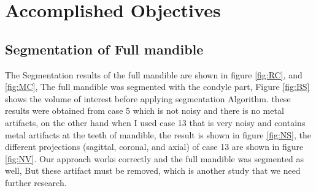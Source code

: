 \documentclass[11.5pt, b5paper]{article}
\begin{document}
\section{Accomplished Objectives}
\subsection{Segmentation of Full mandible}
The Segmentation results of the full mandible are shown in figure \ref{fig:RC}, and \ref{fig:MC}, The full mandible was segmented with the condyle part, Figure \ref{fig:BS} shows the volume of interest before applying segmentation Algorithm. these results were obtained from case 5 which is not noisy and there is no metal artifacts, on the other hand when I used case 13 that is very noisy and contains metal artifacts at the teeth of mandible, the result is shown in figure \ref{fig:NS}, the different projections (sagittal, coronal, and axial) of case 13 are shown in figure \ref{fig:NV}. Our approach works correctly and the full mandible was segmented as well, But these artifact must be removed, which is another study that we need further research.
\end{document}
